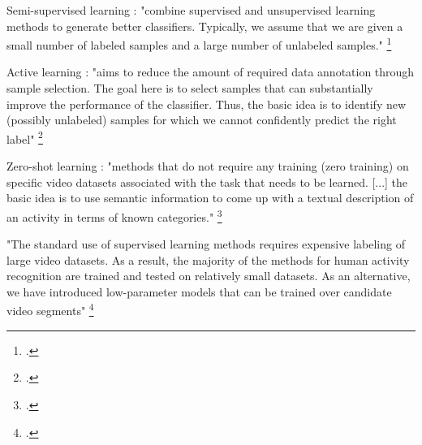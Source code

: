 \begin{itemize}
Semi-supervised learning : "combine supervised
and unsupervised learning methods to generate better classifiers. Typically, we assume that we are given a small number
of labeled samples and a large number of unlabeled samples." \footcite{pattichis2023}

Active learning : "aims to reduce the amount of required data
annotation through sample selection. The goal here is to select
samples that can substantially improve the performance of the
classifier. Thus, the basic idea is to identify new (possibly
unlabeled) samples for which we cannot confidently predict
the right label" \footcite{pattichis2023}

Zero-shot learning : "methods that do not require any training (zero training) on specific video datasets associated with the task that needs to be learned. [...]  the basic idea is to use semantic information to come up with a textual description of an activity in terms of known categories." \footcite{pattichis2023}

"The standard use of supervised learning methods requires expensive labeling of large video datasets. As a result, the majority of the methods for human activity recognition are trained and tested on relatively small datasets. As an alternative, we have introduced low-parameter models that can be trained over candidate video segments" \footcite{pattichis2023}


\end{itemize}